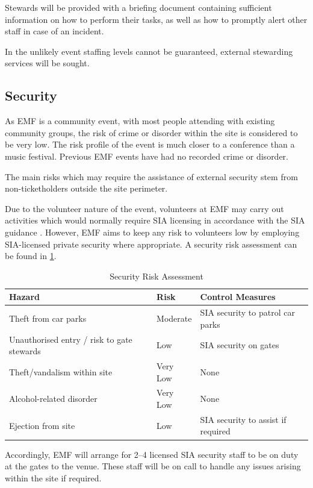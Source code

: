 Stewards will be provided with a briefing document containing sufficient information on how to perform
their tasks, as well as how to promptly alert other staff in case of an incident.

In the unlikely event staffing levels cannot be guaranteed, external stewarding services will be sought.

\subsection{Security}

As EMF is a community event, with most people attending with existing community groups, the risk of crime
or disorder within the site is considered to be very low. The risk profile of the event is much closer
to a conference than a music festival. Previous EMF events have had no recorded crime or disorder.

The main risks which may require the assistance of external security
stem from non-ticketholders outside the site perimeter.

Due to the volunteer nature of the event, volunteers at EMF may carry out activities which would normally
require SIA licensing in accordance with the SIA guidance \cite{sia}. However, EMF aims to keep any risk
to volunteers low by employing SIA-licensed private security where appropriate. A security risk assessment
can be found in \cref{table:security}.

\begin{table}[h!]
\caption{Security Risk Assessment}
\label{table:security}
\centering
\begin{tabular}{| l l l |}
    \hline
    \textbf{Hazard} & \textbf{Risk} & \textbf{Control Measures} \\
    \hline
    Theft from car parks & Moderate & SIA security to patrol car parks \\
    Unauthorised entry / risk to gate stewards & Low & SIA security on gates \\
    Theft/vandalism within site & Very Low & None \\
    Alcohol-related disorder & Very Low & None \\
    Ejection from site & Low & SIA security to assist if required \\
    \hline
\end{tabular}
\end{table}

Accordingly, EMF will arrange for 2--4 licensed SIA security staff to be on duty at the gates to the
venue. These staff will be on call to handle any issues arising within the site if required.
\newpage
